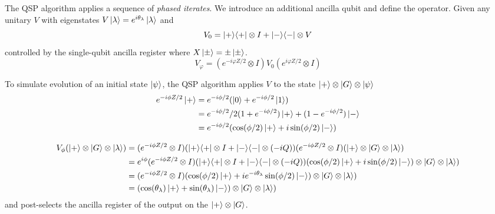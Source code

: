 \documentclass[11pt, oneside]{article}   	%
\begin{document}
The QSP algorithm applies a sequence of \textit{phased iterates}. 
We introduce an additional ancilla qubit and define the operator.
Given any unitary $V$ with eigenstates $V \ket{\lambda} = e^{i \theta_{\lambda}} \ket{\lambda}$ and 
\begin{equation*} 
V_0 = \ket{+} \! \bra{+} \otimes I +  \ket{-} \! \bra{-} \otimes V
\end{equation*}
controlled by the single-qubit ancilla register where $X \ket{\pm} = \pm \ket{\pm}$.
\begin{equation*} 
V_{\varphi} = (e^{-i \varphi Z/2} \otimes I) V_0 (e^{i \varphi Z/2} \otimes I) 
\end{equation*}


To simulate evolution of an initial state $\ket{\psi}$, the QSP algorithm applies $V$ to the state $\ket{+} \otimes \ket{G} \otimes \ket{\psi}$
\begin{align*} 
e^{-i \phi Z/2} \ket{+}
&= e^{-i \phi/2} (\ket{0} + e^{-i \phi/2} \ket{1}) \\
&= e^{-i \phi/2} /2 (1+e^{-i \phi/2}) \ket{+} + (1-e^{-i \phi/2}) \ket{-} \\
&= e^{-i \phi/2}  (\cos(\phi/2) \ket{+} + i \sin(\phi/2) \ket{-})
\end{align*}

\begin{align*} 
V_{\phi} (\ket{+} \otimes \ket{G} \otimes \ket{\lambda})
&= (e^{-i \phi Z/2} \otimes I) (\ket{+} \! \bra{+} \otimes I +  \ket{-} \! \bra{-} \otimes (-iQ)) (e^{-i \phi Z/2} \otimes I) (\ket{+} \otimes \ket{G} \otimes \ket{\lambda}) \\
&= e^{i \phi} (e^{-i \phi Z/2} \otimes I) (\ket{+} \! \bra{+} \otimes I +  \ket{-} \! \bra{-} \otimes (-iQ)) (\cos(\phi/2) \ket{+} + i \sin(\phi/2) \ket{-}) \otimes \ket{G} \otimes \ket{\lambda}) \\
&=  (e^{-i \phi Z/2} \otimes I) (\cos(\phi/2) \ket{+} + ie^{-i \theta_{\lambda}} \sin(\phi/2) \ket{-}) \otimes \ket{G} \otimes \ket{\lambda}) \\
&= (\cos(\theta_{\lambda}) \ket{+} + \sin(\theta_{\lambda}) \ket{-}) \otimes \ket{G} \otimes \ket{\lambda})
\end{align*}
and post-selects the ancilla register of the output on the $\ket{+} \otimes \ket{G}$.
\end{document}
